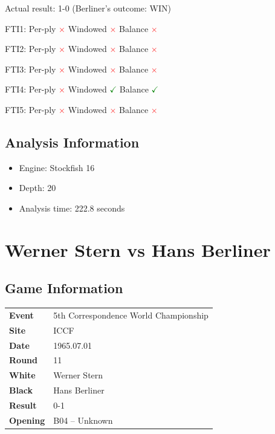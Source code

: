 \documentclass[11pt]{book}
\begin{document}
Actual result: 1-0 (Berliner's outcome: WIN)

FTI1: Per-ply \textcolor{red}{$\times$} \quad Windowed \textcolor{red}{$\times$} \quad Balance \textcolor{red}{$\times$}

FTI2: Per-ply \textcolor{red}{$\times$} \quad Windowed \textcolor{red}{$\times$} \quad Balance \textcolor{red}{$\times$}

FTI3: Per-ply \textcolor{red}{$\times$} \quad Windowed \textcolor{red}{$\times$} \quad Balance \textcolor{red}{$\times$}

FTI4: Per-ply \textcolor{red}{$\times$} \quad Windowed \textcolor{green}{$\checkmark$} \quad Balance \textcolor{green}{$\checkmark$}

FTI5: Per-ply \textcolor{red}{$\times$} \quad Windowed \textcolor{red}{$\times$} \quad Balance \textcolor{red}{$\times$}

\section{Analysis Information}
\begin{itemize}
\item Engine: Stockfish 16
\item Depth: 20
\item Analysis time: 222.8 seconds
\end{itemize}

\chapter{Werner Stern vs Hans Berliner}

\section{Game Information}
\begin{tabular}{ll}
\textbf{Event} & 5th Correspondence World Championship \\
\textbf{Site} & ICCF \\
\textbf{Date} & 1965.07.01 \\
\textbf{Round} & 11 \\
\textbf{White} & Werner Stern \\
\textbf{Black} & Hans Berliner \\
\textbf{Result} & 0-1 \\
\textbf{Opening} & B04 -- Unknown \\
\end{tabular}
\end{document}
